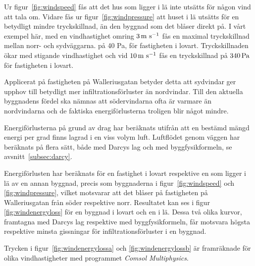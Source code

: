 Ur figur~\ref{fig:windspeed} fås att det hus som ligger i lä inte utsätts för någon vind att tala om.
 Vidare fås ur figur~\ref{fig:windpressure} att huset i lä utsätts för en betydligt mindre 
 tryckskillnad, än den byggnad som det blåser direkt på. I vårt exempel här, med en 
 vindhastighet omring $\unit[3]{m~s^{-1}}$ fås en maximal tryckskillnad mellan norr- och sydväggarna.
 på 40 Pa, för fastigheten i lovart. Tryckskillnaden ökar med stigande vindhastighet och vid $\unit[10]{m~s^{-1}}$ fås en 
 tryckskillnad på $\unit[340]{Pa}$ för fastigheten i lovart. 

Applicerat på fastigheten på Walleriusgatan betyder detta att sydvindar ger upphov till 
betydligt mer infiltrationsförluster än nordvindar. Till den aktuella byggnadens fördel ska nämnas 
att södervindarna ofta är varmare än nordvindarna och de faktiska energiförlusterna 
troligen blir något mindre.


Energiförlusterna på grund av drag har beräknats utifrån att en bestämd mängd energi per grad finns lagrad i en viss volym luft. Luftflödet genom väggen har beräknats på flera sätt, både med Darcys lag och med byggfysikformeln, se avsnitt~\ref{subsec:darcy}.

Energiförlusten har beräknats
  för en fastighet i lovart respektive en som ligger i lä av en annan byggnad, precis som 
  byggnaderna i figur~\ref{fig:windspeed} och \ref{fig:windpressure}, vilket motsvarar att det 
  blåser på fastigheten på Walleriusgatan från söder respektive norr. Resultatet kan ses i figur~
  \ref{fig:windenergyloss} för en byggnad i lovart och en i lä. Dessa två olika kurvor, framtagna med Darcys lag respektive med byggfysikformeln, får motsvara högsta respektive minsta gissningar för infiltrationsförluster i en byggnad.

Trycken i figur~\ref{fig:windenergylossa} och \ref{fig:windenergylossb} är framräknade för 
olika vindhastigheter med programmet \emph{Comsol Multiphysics}.


